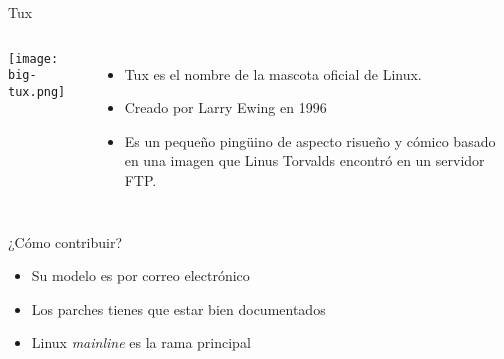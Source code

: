 \begin{frame}[c]{Tux}
  \begin{columns}
      \begin{center}
        \texttt{[image: big-tux.png]}
      \end{center}
      \begin{itemize}
        \item Tux es el nombre de la mascota oficial de Linux.
        \pause
        \item Creado por Larry Ewing en 1996
        \pause
        \item Es un pequeño pingüino de aspecto risueño y cómico basado
          en una imagen que Linus Torvalds encontró en un servidor FTP.
      \end{itemize}
  \end{columns}
\end{frame}

\begin{frame}[c]{¿Cómo contribuir?}
  \begin{itemize}
    \item Su modelo es por correo electrónico
    \pausa
    \item Los parches tienes que estar bien documentados
    \pausa
    \item Linux \emph{mainline} es la rama principal
  \end{itemize}
\end{frame}

